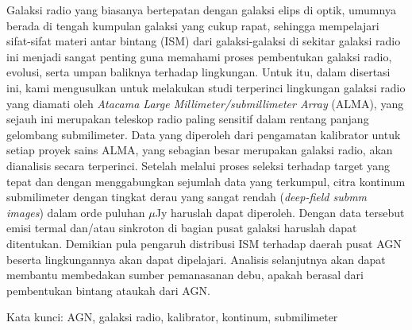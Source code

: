 Galaksi radio yang biasanya bertepatan dengan galaksi elips di optik, umumnya berada di tengah kumpulan galaksi yang cukup rapat, sehingga mempelajari sifat-sifat materi antar bintang (ISM) dari galaksi-galaksi di sekitar galaksi radio ini menjadi sangat penting guna memahami proses pembentukan galaksi radio, evolusi, serta umpan baliknya terhadap lingkungan. Untuk itu, dalam disertasi ini, kami mengusulkan untuk melakukan  studi terperinci lingkungan galaksi radio yang diamati oleh {\it Atacama Large Millimeter/submillimeter Array} (ALMA), yang sejauh ini merupakan teleskop radio paling sensitif dalam rentang panjang gelombang submilimeter. Data yang diperoleh dari pengamatan kalibrator untuk setiap proyek sains ALMA, yang sebagian besar merupakan galaksi radio, akan dianalisis secara terperinci. Setelah melalui proses seleksi terhadap target yang tepat dan dengan menggabungkan sejumlah data yang terkumpul, citra  kontinum submilimeter dengan tingkat derau yang sangat rendah ({\it deep-field submm images}) dalam orde puluhan $\mu$Jy haruslah dapat diperoleh. Dengan data tersebut emisi termal dan/atau sinkroton di bagian pusat galaksi haruslah dapat ditentukan. Demikian pula pengaruh distribusi ISM terhadap daerah pusat AGN beserta lingkungannya akan dapat dipelajari. Analisis selanjutnya akan dapat membantu membedakan sumber pemanasanan debu, apakah berasal dari pembentukan bintang ataukah dari AGN.


\vspace{1.0cm}

\noindent Kata kunci: AGN, galaksi radio, kalibrator, kontinum, submilimeter



